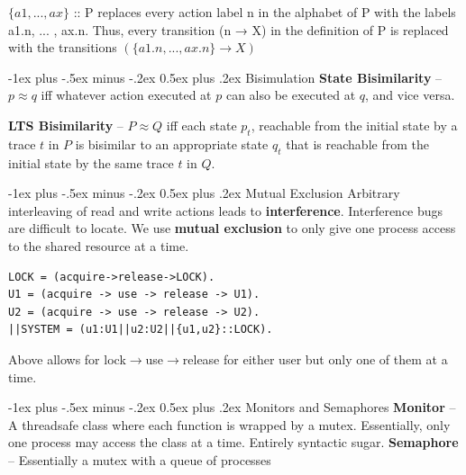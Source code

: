 \documentclass[letterpaper, 8pt]{extarticle}
\makeatletter
\renewcommand{\section}{\@startsection{section}{1}{0mm}%
                                {-1ex plus -.5ex minus -.2ex}%
                                {0.5ex plus .2ex}%
                                {\normalfont\normalsize\bfseries}}
\makeatother
\begin{document}
\begin{multicols*}{5}
$\{a1, . . . , ax\}$ :: P replaces every action label n in the alphabet
of P with the labels a1.n, ... , ax.n. Thus, every transition
(n → X) in the definition of P is replaced with the transitions
$(\{a1.n, . . . , ax.n\} \xrightarrow{} X)$

\section{Bisimulation}
\textbf{State Bisimilarity} -- $p \approx q$ iff whatever action executed at $p$ can also be executed at $q$, and vice versa.

\textbf{LTS Bisimilarity} -- $P \approx Q$ iff each state $p_t$, reachable from the initial state by a trace $t$ in $P$ is bisimilar to an appropriate state $q_t$ that is reachable from the initial state by the same trace $t$ in $Q$.



\section{Mutual Exclusion}
Arbitrary interleaving of read and write actions leads to \textbf{interference}.
Interference bugs are difficult to locate.
We use \textbf{mutual exclusion} to only give one process access to the shared resource at a time.

\begin{lstlisting}
LOCK = (acquire->release->LOCK).
U1 = (acquire -> use -> release -> U1).
U2 = (acquire -> use -> release -> U2).
||SYSTEM = (u1:U1||u2:U2||{u1,u2}::LOCK).
\end{lstlisting}
Above allows for lock$\xrightarrow{}$use$\xrightarrow{}$release for either user but only one of them at a time.

\section{Monitors and Semaphores}
\textbf{Monitor} -- A threadsafe class where each function is wrapped by a mutex. Essentially, only one process may access the class at a time. Entirely syntactic sugar.
\textbf{Semaphore} -- Essentially a mutex with a queue of processes


\end{multicols*}
\end{document}
